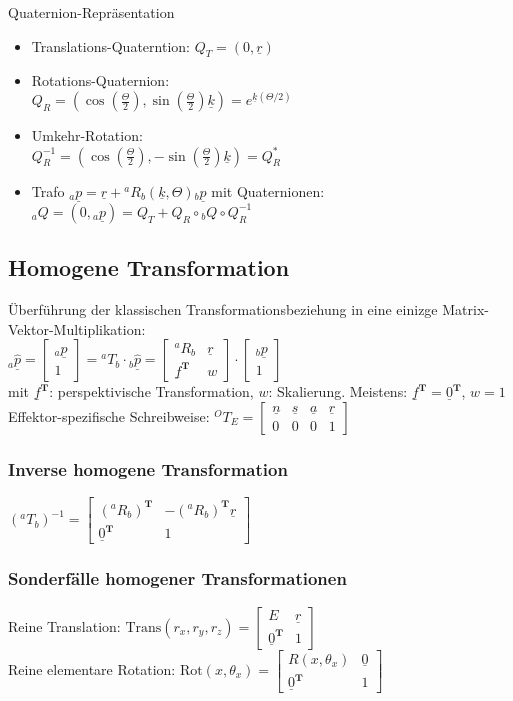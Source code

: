 \documentclass[a4paper,landscape,6pt]{article}
\newcommand{\ma}[1]{\ensuremath{\boldsymbol {#1}}}								%
\newcommand{\mat}[1]{\ensuremath{\begin{bmatrix} #1 \end{bmatrix}}}				%
\newcommand{\ul}[1]{\underline{#1}}
\begin{document}
\begin{multicols}{3}
\begin{infobox}{Quaternion-Repräsentation}
\begin{itemize}
	\item Translations-Quaterntion: $Q_T = (0, \ul r)$
	\item Rotations-Quaternion: \\ $Q_R = (\cos(\frac{\Theta}{2}), \sin(\frac{\Theta}{2}) \ul k) = e^{\ul k (\Theta / 2)}$
	\item Umkehr-Rotation: \\ $Q_R^{-1} = (\cos(\frac{\Theta}{2}), -\sin(\frac{\Theta}{2}) \ul k) = Q_R^*$
	\item Trafo ${}_{a}{\ul p} = \ul r + {}^{a}{R}_b(\ul k, \Theta) {}_{b}{\ul p}$ mit Quaternionen:\\
	\subitem ${}_a Q = (0, {}_{a}{\ul p}) = Q_T + Q_R \circ {}_b Q \circ Q_R^{-1}$
\end{itemize}
\end{infobox}
\subsection*{Homogene Transformation}
Überführung der klassischen Transformationsbeziehung in eine einizge Matrix-Vektor-Multiplikation:\\

$\boxed{ {}_{a}{\ul {\hat p}} = \mat{{}_{a}{\ul p} \\ 1} =  {}^{a}{T}_b \cdot {}_{b}{\ul {\hat p}} = \mat{{}^{a}{R}_b & \ul r \\ \ul f^{\ma T} & w} \cdot \mat{{}_{b}{\ul p} \\ 1} }$\\

mit $\ul f^{\ma T}$: perspektivische Transformation, $w$: Skalierung. Meistens: $\ul f^{\ma T} = \ul 0^{\ma T}$, $w=1$\\
Effektor-spezifische Schreibweise: ${}^{O}{T}_E = \mat{\ul n & \ul s & \ul a & \ul r \\ 0 & 0 & 0 & 1}$\\

\subsubsection*{Inverse homogene Transformation}
$({}^{a}{T}_b)^{-1} = \mat{({}^{a}{R}_b)^{\ma T} & -({}^{a}{R}_b)^{\ma T} \ul r \\ \ul 0^{\ma T} & 1} $\\
\subsubsection*{Sonderfälle homogener Transformationen}
Reine Translation: 
$\text{Trans}(r_x,r_y,r_z) = \mat{E & \ul r \\ \ul 0^{\ma T} & 1}$\\
Reine elementare Rotation:
$\text{Rot}(x,\theta_x) = \mat{R(x,\theta_x) & \ul 0 \\ \ul 0^{\ma T} & 1}$\\

\end{multicols}
\end{document}
